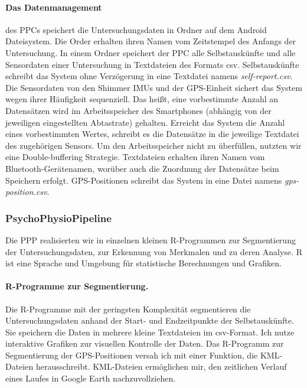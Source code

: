 \paragraph{Das Datenmanagement} 

\label{par:das_datenmanagement} des \ac{PPC}s speichert die Untersuchungsdaten in Ordner auf dem Android Dateisystem. Die Order erhalten ihren Namen vom Zeitstempel des Anfangs der Untersuchung. In einem Ordner speichert der \ac{PPC} alle Selbstauskünfte und alle Sensordaten einer Untersuchung in Textdateien des Formats \acs{csv}. Selbstauskünfte schreibt das System ohne Verzögerung in eine Textdatei namens \emph{self-report.csv}. Die Sensordaten von den Shimmer \acp{IMU} und der \ac{GPS}-Einheit sichert das System wegen ihrer Häufigkeit sequenziell. Das heißt, eine vorbestimmte Anzahl an Datensätzen wird im Arbeitsspeicher des Smartphones (abhängig von der jeweiligen eingestellten Abtastrate) gehalten. Erreicht das System die Anzahl eines vorbestimmten Wertes, schreibt es die Datensätze in die jeweilige Textdatei des zugehörigen Sensors. Um den Arbeitsspeicher nicht zu überfüllen, nutzten wir eine Double-buffering Strategie. Textdateien erhalten ihren Namen vom Bluetooth-Gerätenamen, worüber auch die Zuordnung der Datensätze beim Speichern erfolgt. \ac{GPS}-Positionen schreibt das System in eine Datei namens \emph{gps-position.csv}.

\subsubsection{PsychoPhysioPipeline} 

\label{ssub:psychophysiopipeline}

Die \ac{PPP} realisierten wir in einzelnen kleinen R-Programmen zur Segmentierung der Untersuchungsdaten, zur Erkennung von Merkmalen und zu deren Analyse. R ist eine Sprache und Umgebung für statistische Berechnungen und Grafiken.

\paragraph{R-Programme zur Segmentierung.} 

\label{par:r_programme_zur_segmentierung}

Die R-Programme mit der geringsten Komplexität segmentieren die Untersuchungsdaten anhand der Start- und Endzeitpunkte der Selbstauskünfte. Sie speichern die Daten in mehrere kleine Textdateien im \acs{csv}-Format. Ich nutze interaktive Grafiken zur visuellen Kontrolle der Daten. Das R-Programm zur Segmentierung der \ac{GPS}-Positionen versah ich mit einer Funktion, die \acs{KML}-Dateien herausschreibt. \acs{KML}-Dateien ermöglichen mir, den zeitlichen Verlauf eines Laufes in Google Earth nachzuvollziehen.

